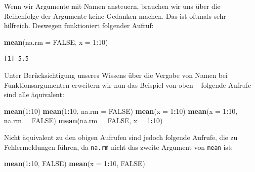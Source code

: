 \documentclass[12pt,]{tufte-book}
\newenvironment{Shaded}{\begin{snugshade}}{\end{snugshade}}
\newcommand{\KeywordTok}[1]{\textcolor[rgb]{0.13,0.29,0.53}{\textbf{#1}}}
\newcommand{\DataTypeTok}[1]{\textcolor[rgb]{0.13,0.29,0.53}{#1}}
\newcommand{\DecValTok}[1]{\textcolor[rgb]{0.00,0.00,0.81}{#1}}
\newcommand{\OtherTok}[1]{\textcolor[rgb]{0.56,0.35,0.01}{#1}}
\newcommand{\OperatorTok}[1]{\textcolor[rgb]{0.81,0.36,0.00}{\textbf{#1}}}
\newcommand{\NormalTok}[1]{#1}
\theoremstyle{definition}
\theoremstyle{definition}
\theoremstyle{definition}
\theoremstyle{remark}
\begin{document}
Wenn wir Argumente mit Namen ansteuern, brauchen wir uns über die
Reihenfolge der Argumente keine Gedanken machen. Das ist oftmals sehr
hilfreich. Deswegen funktioniert folgender Aufruf:

\begin{Shaded}
\begin{Highlighting}[]
\KeywordTok{mean}\NormalTok{(}\DataTypeTok{na.rm =} \OtherTok{FALSE}\NormalTok{, }\DataTypeTok{x =} \DecValTok{1}\OperatorTok{:}\DecValTok{10}\NormalTok{)}
\end{Highlighting}
\end{Shaded}

\begin{verbatim}
[1] 5.5
\end{verbatim}

Unter Berücksichtigung unseres Wissens über die Vergabe von Namen bei
Funktionsargumenten erweitern wir nun das Beispiel von oben -- folgende
Aufrufe sind alle äquivalent:

\begin{Shaded}
\begin{Highlighting}[]
\KeywordTok{mean}\NormalTok{(}\DecValTok{1}\OperatorTok{:}\DecValTok{10}\NormalTok{)}
\KeywordTok{mean}\NormalTok{(}\DecValTok{1}\OperatorTok{:}\DecValTok{10}\NormalTok{, }\DataTypeTok{na.rm =} \OtherTok{FALSE}\NormalTok{)}
\KeywordTok{mean}\NormalTok{(}\DataTypeTok{x =} \DecValTok{1}\OperatorTok{:}\DecValTok{10}\NormalTok{)}
\KeywordTok{mean}\NormalTok{(}\DataTypeTok{x =} \DecValTok{1}\OperatorTok{:}\DecValTok{10}\NormalTok{, }\DataTypeTok{na.rm =} \OtherTok{FALSE}\NormalTok{)}
\KeywordTok{mean}\NormalTok{(}\DataTypeTok{na.rm =} \OtherTok{FALSE}\NormalTok{, }\DataTypeTok{x =} \DecValTok{1}\OperatorTok{:}\DecValTok{10}\NormalTok{)}
\end{Highlighting}
\end{Shaded}

Nicht äquivalent zu den obigen Aufrufen sind jedoch folgende Aufrufe,
die zu Fehlermeldungen führen, da \texttt{na.rm} nicht das zweite
Argument von \texttt{mean} ist:

\begin{Shaded}
\begin{Highlighting}[]
\KeywordTok{mean}\NormalTok{(}\DecValTok{1}\OperatorTok{:}\DecValTok{10}\NormalTok{, }\OtherTok{FALSE}\NormalTok{)}
\KeywordTok{mean}\NormalTok{(}\DataTypeTok{x =} \DecValTok{1}\OperatorTok{:}\DecValTok{10}\NormalTok{, }\OtherTok{FALSE}\NormalTok{)}
\end{Highlighting}
\end{Shaded}
\end{document}
